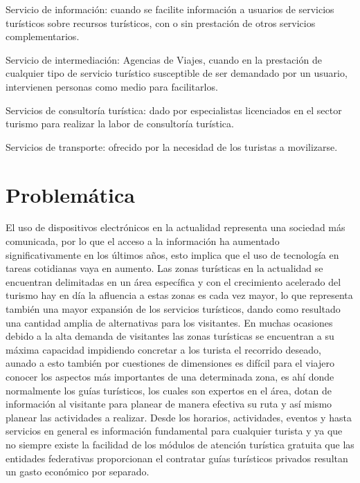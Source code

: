 	 Servicio de información: cuando se facilite información a usuarios de servicios turísticos sobre recursos turísticos, con o sin prestación de otros servicios complementarios.
	
	 Servicio de intermediación: Agencias de Viajes, cuando en la prestación de cualquier tipo de servicio turístico susceptible de ser demandado por un usuario, intervienen personas como medio para facilitarlos.
	
	 Servicios de consultoría turística: dado por especialistas licenciados en el sector turismo para realizar la labor de consultoría turística.
	
	 Servicios de transporte: ofrecido por la necesidad de los turistas a movilizarse.
	




\section{Problemática}

	
	El uso de dispositivos electrónicos en la actualidad representa una sociedad más comunicada, por lo que el acceso a la información ha aumentado significativamente en los últimos años, esto implica que el uso de tecnología en tareas cotidianas vaya en aumento.
	Las zonas turísticas en la actualidad se encuentran delimitadas en un área específica y con el crecimiento acelerado del turismo hay en día la afluencia a estas zonas es cada vez mayor, lo que representa también una mayor expansión de los servicios turísticos, dando como resultado una cantidad amplia de alternativas para los visitantes.
	En muchas ocasiones debido a la alta demanda de visitantes las zonas turísticas se encuentran a su máxima capacidad impidiendo concretar a los turista el recorrido deseado, aunado a esto también por cuestiones de dimensiones es difícil para el viajero conocer los aspectos más importantes de una determinada zona, es ahí donde normalmente los guías turísticos, los cuales son expertos en el área, dotan de información al visitante para planear de manera efectiva su ruta y así mismo planear las actividades a realizar.
	Desde los horarios, actividades, eventos y hasta servicios en general es información fundamental para cualquier turista y ya que no siempre existe la facilidad de los módulos de atención turística gratuita que las entidades federativas proporcionan el contratar guías turísticos privados resultan un gasto económico por separado.
	
	



